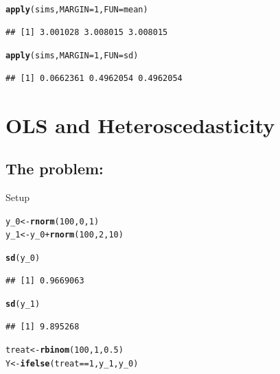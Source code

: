 \documentclass[12 pt]{article}\usepackage[]{graphicx}\usepackage[]{color}
\makeatletter
\newcommand{\hlnum}[1]{\textcolor[rgb]{0.686,0.059,0.569}{#1}}%
\newcommand{\hlopt}[1]{\textcolor[rgb]{0,0,0}{#1}}%
\newcommand{\hlstd}[1]{\textcolor[rgb]{0.345,0.345,0.345}{#1}}%
\newcommand{\hlkwb}[1]{\textcolor[rgb]{0.69,0.353,0.396}{#1}}%
\newcommand{\hlkwc}[1]{\textcolor[rgb]{0.333,0.667,0.333}{#1}}%
\newcommand{\hlkwd}[1]{\textcolor[rgb]{0.737,0.353,0.396}{\textbf{#1}}}%
\newenvironment{kframe}{%
 \def\at@end@of@kframe{}%
 \ifinner\ifhmode%
  \def\at@end@of@kframe{\end{minipage}}%
  \begin{minipage}{\columnwidth}%
 \fi\fi%
 \def\FrameCommand##1{\hskip\@totalleftmargin \hskip-\fboxsep
 \colorbox{shadecolor}{##1}\hskip-\fboxsep
     \hskip-\linewidth \hskip-\@totalleftmargin \hskip\columnwidth}%
 \MakeFramed {\advance\hsize-\width
   \@totalleftmargin\z@ \linewidth\hsize
   \@setminipage}}%
 {\par\unskip\endMakeFramed%
 \at@end@of@kframe}
\newenvironment{knitrout}{}{} %
\makeatother
\begin{document}
\begin{knitrout}
\color{fgcolor}\begin{kframe}
\begin{alltt}
\hlkwd{apply}\hlstd{(sims,} \hlkwc{MARGIN} \hlstd{=} \hlnum{1}\hlstd{,} \hlkwc{FUN} \hlstd{= mean)}
\end{alltt}
\begin{verbatim}
## [1] 3.001028 3.008015 3.008015
\end{verbatim}
\begin{alltt}
\hlkwd{apply}\hlstd{(sims,} \hlkwc{MARGIN} \hlstd{=} \hlnum{1}\hlstd{,} \hlkwc{FUN} \hlstd{= sd)}
\end{alltt}
\begin{verbatim}
## [1] 0.0662361 0.4962054 0.4962054
\end{verbatim}
\end{kframe}
\end{knitrout}


\clearpage
\section*{OLS and Heteroscedasticity}

\subsection*{The problem:}
Setup
\begin{knitrout}
\color{fgcolor}\begin{kframe}
\begin{alltt}
\hlstd{y_0} \hlkwb{<-} \hlkwd{rnorm}\hlstd{(}\hlnum{100}\hlstd{,} \hlnum{0}\hlstd{,} \hlnum{1}\hlstd{)}
\hlstd{y_1} \hlkwb{<-} \hlstd{y_0} \hlopt{+} \hlkwd{rnorm}\hlstd{(}\hlnum{100}\hlstd{,} \hlnum{2}\hlstd{,} \hlnum{10}\hlstd{)}

\hlkwd{sd}\hlstd{(y_0)}
\end{alltt}
\begin{verbatim}
## [1] 0.9669063
\end{verbatim}
\begin{alltt}
\hlkwd{sd}\hlstd{(y_1)}
\end{alltt}
\begin{verbatim}
## [1] 9.895268
\end{verbatim}
\begin{alltt}
\hlstd{treat} \hlkwb{<-} \hlkwd{rbinom}\hlstd{(}\hlnum{100}\hlstd{,} \hlnum{1}\hlstd{,} \hlnum{0.5}\hlstd{)}
\hlstd{Y} \hlkwb{<-} \hlkwd{ifelse}\hlstd{(treat} \hlopt{==} \hlnum{1}\hlstd{, y_1, y_0)}
\end{alltt}
\end{kframe}
\end{knitrout}
\end{document}
